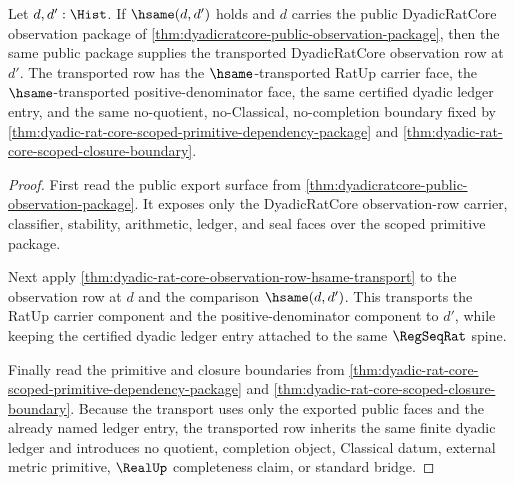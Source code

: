 \begin{theorem}
\label{thm:dyadicratcore-public-observation-hsame-transport}
Let $d,d':\Hist$. If $\hsame(d,d')$ holds and $d$ carries the public
DyadicRatCore observation package of
\autoref{thm:dyadicratcore-public-observation-package}, then the same public
package supplies the transported DyadicRatCore observation row at $d'$. The
transported row has the $\hsame$-transported RatUp carrier face, the
$\hsame$-transported positive-denominator face, the same certified dyadic
ledger entry, and the same no-quotient, no-Classical, no-completion boundary
fixed by
\autoref{thm:dyadic-rat-core-scoped-primitive-dependency-package} and
\autoref{thm:dyadic-rat-core-scoped-closure-boundary}.
\end{theorem}
\begin{proof}
First read the public export surface from
\autoref{thm:dyadicratcore-public-observation-package}. It exposes only the
DyadicRatCore observation-row carrier, classifier, stability, arithmetic,
ledger, and seal faces over the scoped primitive package.

Next apply \autoref{thm:dyadic-rat-core-observation-row-hsame-transport} to
the observation row at $d$ and the comparison $\hsame(d,d')$. This transports
the RatUp carrier component and the positive-denominator component to $d'$,
while keeping the certified dyadic ledger entry attached to the same
$\RegSeqRat$ spine.

Finally read the primitive and closure boundaries from
\autoref{thm:dyadic-rat-core-scoped-primitive-dependency-package} and
\autoref{thm:dyadic-rat-core-scoped-closure-boundary}. Because the transport
uses only the exported public faces and the already named ledger entry, the
transported row inherits the same finite dyadic ledger and introduces no
quotient, completion object, Classical datum, external metric primitive,
$\RealUp$ completeness claim, or standard bridge.
\end{proof}

